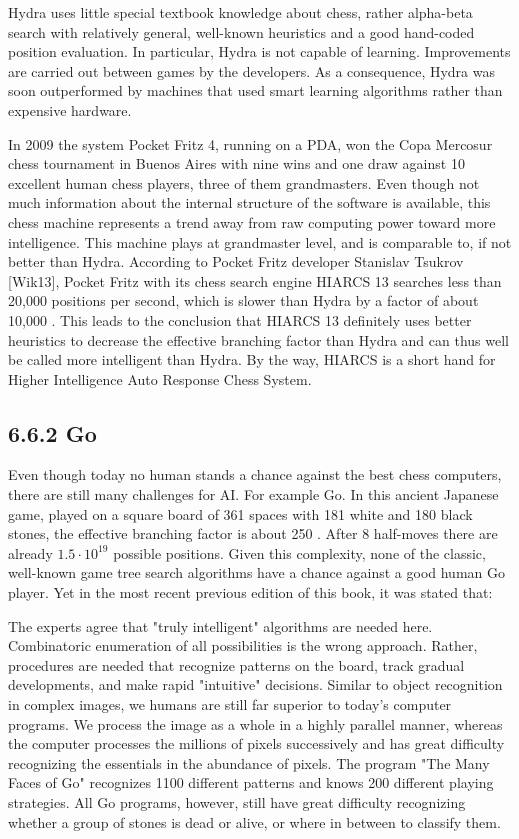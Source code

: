 \documentclass[10pt]{article}
\begin{document}
Hydra uses little special textbook knowledge about chess, rather alpha-beta search with relatively general, well-known heuristics and a good hand-coded\\
position evaluation. In particular, Hydra is not capable of learning. Improvements are carried out between games by the developers. As a consequence, Hydra was soon outperformed by machines that used smart learning algorithms rather than expensive hardware.

In 2009 the system Pocket Fritz 4, running on a PDA, won the Copa Mercosur chess tournament in Buenos Aires with nine wins and one draw against 10 excellent human chess players, three of them grandmasters. Even though not much information about the internal structure of the software is available, this chess machine represents a trend away from raw computing power toward more intelligence. This machine plays at grandmaster level, and is comparable to, if not better than Hydra. According to Pocket Fritz developer Stanislav Tsukrov [Wik13], Pocket Fritz with its chess search engine HIARCS 13 searches less than 20,000 positions per second, which is slower than Hydra by a factor of about 10,000 . This leads to the conclusion that HIARCS 13 definitely uses better heuristics to decrease the effective branching factor than Hydra and can thus well be called more intelligent than Hydra. By the way, HIARCS is a short hand for Higher Intelligence Auto Response Chess System.

\subsection*{6.6.2 Go}
Even though today no human stands a chance against the best chess computers, there are still many challenges for AI. For example Go. In this ancient Japanese game, played on a square board of 361 spaces with 181 white and 180 black stones, the effective branching factor is about 250 . After 8 half-moves there are already $1.5 \cdot 10^{19}$ possible positions. Given this complexity, none of the classic, well-known game tree search algorithms have a chance against a good human Go player. Yet in the most recent previous edition of this book, it was stated that:

\begin{displayquote}
The experts agree that "truly intelligent" algorithms are needed here. Combinatoric enumeration of all possibilities is the wrong approach. Rather, procedures are needed that recognize patterns on the board, track gradual developments, and make rapid "intuitive" decisions. Similar to object recognition in complex images, we humans are still far superior to today's computer programs. We process the image as a whole in a highly parallel manner, whereas the computer processes the millions of pixels successively and has great difficulty recognizing the essentials in the abundance of pixels. The program "The Many Faces of Go" recognizes 1100 different patterns and knows 200 different playing strategies. All Go programs, however, still have great difficulty recognizing whether a group of stones is dead or alive, or where in between to classify them.
\end{displayquote}
\end{document}
